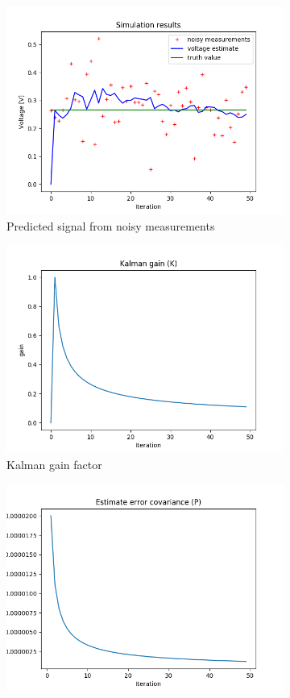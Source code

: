 \documentclass{article}
\begin{document}
    \begin{figure}[H]
        \begin{subfigure} {.5\textwidth}  
            \centering 
            \includegraphics[width=0.6\linewidth]{./img/r00001q_.png}
            \caption{Predicted signal from noisy measurements }
        \end{subfigure}
        \begin{subfigure}{.5\textwidth}            
            \centering
            \includegraphics[width=0.6\linewidth]{./img/r00001q_K.png}
            \caption{Kalman gain factor}
        \end{subfigure}
        \begin{subfigure} {.5\textwidth}  
            \centering 
            \includegraphics[width=0.6\linewidth]{./img/r00001q_P.png}

\end{subfigure}
\end{figure}
\end{document}
